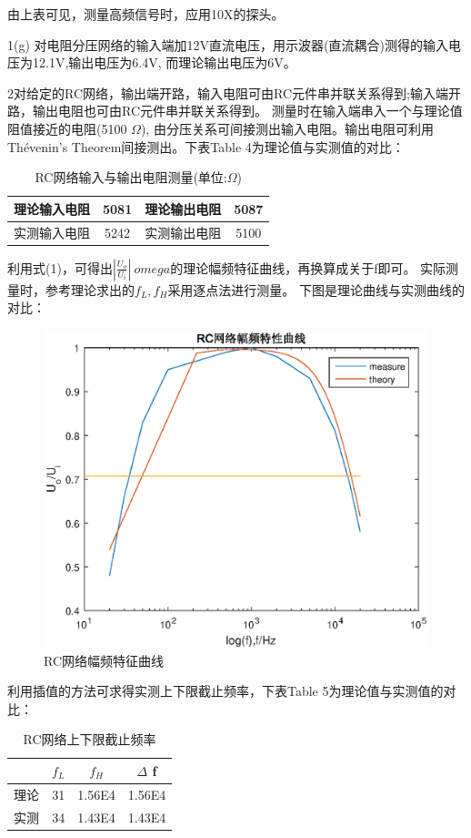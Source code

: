 ﻿\documentclass[10.5pt]{ctexart}
\begin{document}
由上表可见，测量高频信号时，应用10X的探头。

1(g) 对电阻分压网络的输入端加12V直流电压，用示波器(直流耦合)测得的输入电压为12.1V,输出电压为6.4V,
而理论输出电压为6V。


2对给定的RC网络，输出端开路，输入电阻可由RC元件串并联关系得到;输入端开路，输出电阻也可由RC元件串并联关系得到。
测量时在输入端串入一个与理论值阻值接近的电阻(5100 $\Omega$),
由分压关系可间接测出输入电阻。输出电阻可利用Th\'evenin's Theorem间接测出。下表Table 4为理论值与实测值的对比：
\begin{table}[!ht]
\centering
\caption{RC网络输入与输出电阻测量(单位:$\Omega$)}
\begin{tabular}{cc|cc}
\hline
理论输入电阻 & 5081 & 理论输出电阻 & 5087  \\
\hline
实测输入电阻 & 5242 & 实测输出电阻 & 5100  \\
\hline
\end{tabular}
\end{table}

利用式(1)，可得出$|\frac{U_o}{U_i}|~omega$的理论幅频特征曲线，再换算成关于f即可。
实际测量时，参考理论求出的$f_L,f_H$采用逐点法进行测量。
下图是理论曲线与实测曲线的对比：
\newpage
\begin{figure}[!ht]
\centering
\caption{RC网络幅频特征曲线}
\includegraphics[width=400pt]{image/amplitudeFrequencyCharacteristics.eps}
\end{figure}
利用插值的方法可求得实测上下限截止频率，下表Table 5为理论值与实测值的对比：
\begin{table}[!ht]
\centering
\caption{RC网络上下限截止频率}
\begin{tabular}{cccc}
\hline
 & $f_L$ & $f_H$ & $\Delta$ f \\
\hline
理论& 31 & 1.56E4 &  1.56E4  \\
实测& 34 & 1.43E4 &  1.43E4  \\
\hline
\end{tabular}
\end{table}
\end{document}

